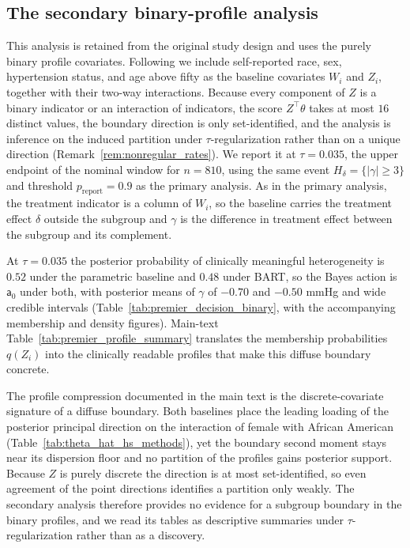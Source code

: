 \documentclass[11pt]{article}
\theoremstyle{definition}
\theoremstyle{plain}
\begin{document}
\subsection{The secondary binary-profile analysis}
\label{sec:analysis_secondary}
This analysis is retained from the original study design and uses the purely binary profile covariates. Following \citet{Svetkey2005} we include self-reported race, sex, hypertension status, and age above fifty as the baseline covariates $W_i$ and $Z_i$, together with their two-way interactions. Because every component of $Z$ is a binary indicator or an interaction of indicators, the score $Z^\top\theta$ takes at most $16$ distinct values, the boundary direction is only set-identified, and the analysis is inference on the induced partition under $\tau$-regularization rather than on a unique direction (Remark~\ref{rem:nonregular_rates}). We report it at $\tau=0.035$, the upper endpoint of the nominal window for $n=810$, using the same event $H_\delta=\{|\gamma|\ge3\}$ and threshold $p_{\mathrm{report}}=0.9$ as the primary analysis. As in the primary analysis, the treatment indicator is a column of $W_i$, so the baseline carries the treatment effect $\delta$ outside the subgroup and $\gamma$ is the difference in treatment effect between the subgroup and its complement.

At $\tau=0.035$ the posterior probability of clinically meaningful heterogeneity is $0.52$ under the parametric baseline and $0.48$ under BART, so the Bayes action is $\mathsf a_0$ under both, with posterior means of $\gamma$ of $-0.70$ and $-0.50$ mmHg and wide credible intervals (Table~\ref{tab:premier_decision_binary}, with the accompanying membership and density figures). Main-text Table~\ref{tab:premier_profile_summary} translates the membership probabilities $q(Z_i)$ into the clinically readable profiles that make this diffuse boundary concrete.

The profile compression documented in the main text is the discrete-covariate signature of a diffuse boundary. Both baselines place the leading loading of the posterior principal direction on the interaction of female with African American (Table~\ref{tab:theta_hat_hs_methods}), yet the boundary second moment stays near its dispersion floor and no partition of the profiles gains posterior support. Because $Z$ is purely discrete the direction is at most set-identified, so even agreement of the point directions identifies a partition only weakly. The secondary analysis therefore provides no evidence for a subgroup boundary in the binary profiles, and we read its tables as descriptive summaries under $\tau$-regularization rather than as a discovery.
\end{document}
